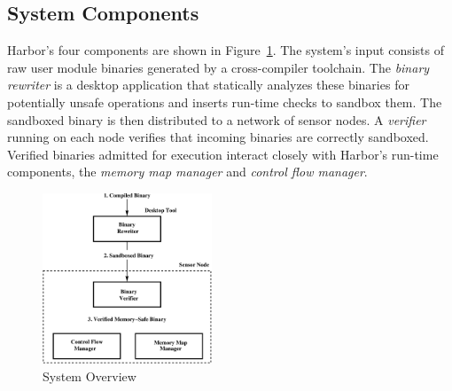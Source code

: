 \subsection{System Components}
% 
Harbor's four components are shown in Figure~\ref{fig:sys_overview}.
% 
% 
The system's input consists of raw user module binaries generated by a
cross-compiler toolchain.
% 
The \emph{binary rewriter} is a desktop application that statically
analyzes these binaries for potentially unsafe operations and inserts
run-time checks to sandbox them.
% 
The sandboxed binary is then distributed to a network of sensor nodes.
% 
A \emph{verifier} running on each node verifies that incoming binaries
are correctly sandboxed.
% 
Verified binaries admitted for execution interact closely
with Harbor's run-time components, the \emph{memory map manager} and \emph{control flow
  manager}.
%
\begin{figure}[htbp]
  \centering
  \includegraphics[height = 2.0in, keepaspectratio=true]{figures/sysoverview.eps} 
  \caption{System Overview}
  \label{fig:sys_overview}
\end{figure}
